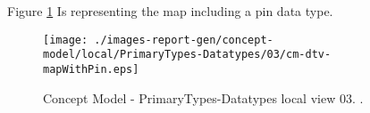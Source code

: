 Figure \ref{fig:lu.uni.lassy.excalibur.group09.spec-CM-view-local-PrimaryTypes-Datatypes-03} Is representing the map including a pin data type.



\begin{figure}[htbp] 
\label{fig:lu.uni.lassy.excalibur.group09.spec-CM}
\begin{center}
\texttt{[image: ./images-report-gen/concept-model/local/PrimaryTypes-Datatypes/03/cm-dtv-mapWithPin.eps]}
\end{center}
\caption[Concept Model - PrimaryTypes-Datatypes local view 03 - ]{Concept Model - PrimaryTypes-Datatypes local view 03. .}
\label{fig:lu.uni.lassy.excalibur.group09.spec-CM-view-local-PrimaryTypes-Datatypes-03}
\end{figure}
\vspace{0.5cm} 
